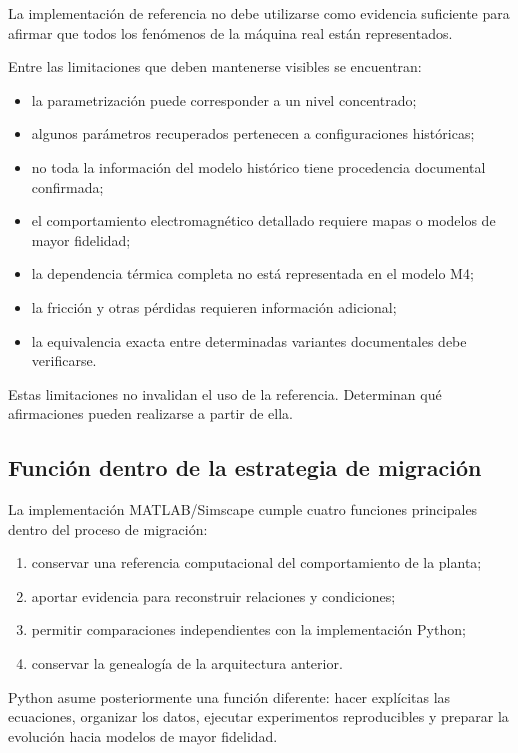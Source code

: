La implementación de referencia no debe utilizarse como evidencia suficiente para afirmar que todos los fenómenos de la máquina real están representados.

Entre las limitaciones que deben mantenerse visibles se encuentran:

\begin{itemize}
    \item la parametrización puede corresponder a un nivel concentrado;
    \item algunos parámetros recuperados pertenecen a configuraciones históricas;
    \item no toda la información del modelo histórico tiene procedencia documental confirmada;
    \item el comportamiento electromagnético detallado requiere mapas o modelos de mayor fidelidad;
    \item la dependencia térmica completa no está representada en el modelo M4;
    \item la fricción y otras pérdidas requieren información adicional;
    \item la equivalencia exacta entre determinadas variantes documentales debe verificarse.
\end{itemize}

Estas limitaciones no invalidan el uso de la referencia. Determinan qué afirmaciones pueden realizarse a partir de ella.

\subsection{Función dentro de la estrategia de migración}

La implementación MATLAB/Simscape cumple cuatro funciones principales dentro del proceso de migración:

\begin{enumerate}
    \item conservar una referencia computacional del comportamiento de la planta;
    \item aportar evidencia para reconstruir relaciones y condiciones;
    \item permitir comparaciones independientes con la implementación Python;
    \item conservar la genealogía de la arquitectura anterior.
\end{enumerate}

Python asume posteriormente una función diferente: hacer explícitas las ecuaciones, organizar los datos, ejecutar experimentos reproducibles y preparar la evolución hacia modelos de mayor fidelidad.

